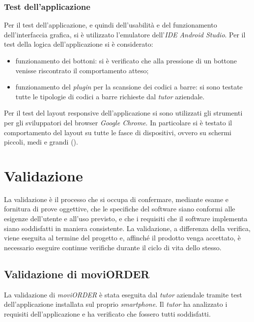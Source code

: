 \subsubsection{Test dell'applicazione}

Per il test dell'applicazione, e quindi dell'usabilità e del funzionamento dell'interfaccia grafica, si è utilizzato l'emulatore dell'\textit{IDE} \textit{Android Studio}. Per il test della logica dell'applicazione si è considerato:
\begin{itemize}
	\item funzionamento dei bottoni: si è verificato che alla pressione di un bottone venisse riscontrato il comportamento atteso;
	\item funzionamento del \textit{plugin} per la scansione dei codici a barre: si sono testate tutte le tipologie di codici a barre richieste dal \textit{tutor} aziendale.
\end{itemize}

Per il test del layout responsive dell'applicazione si sono utilizzati gli strumenti per gli sviluppatori del browser \textit{Google Chrome}. In particolare si è testato il comportamento del layout su tutte le fasce di dispositivi, ovvero su schermi piccoli, medi e grandi ().

\section{Validazione}

La validazione è il processo che si occupa di confermare, mediante esame e fornitura di prove oggettive, che le specifiche del software siano conformi alle esigenze dell'utente e all'uso previsto, e che i requisiti che il software implementa siano soddisfatti in maniera consistente.
La validazione, a differenza della verifica, viene eseguita al termine del progetto e, affinché il prodotto venga accettato, è necessario eseguire continue verifiche durante il ciclo di vita dello stesso.

\subsection{Validazione di moviORDER}

La validazione di \textit{moviORDER} è stata eseguita dal \textit{tutor} aziendale tramite test dell'applicazione installata sul proprio \textit{smartphone}. Il \textit{tutor} ha analizzato i requisiti dell'applicazione e ha verificato che fossero tutti soddisfatti.